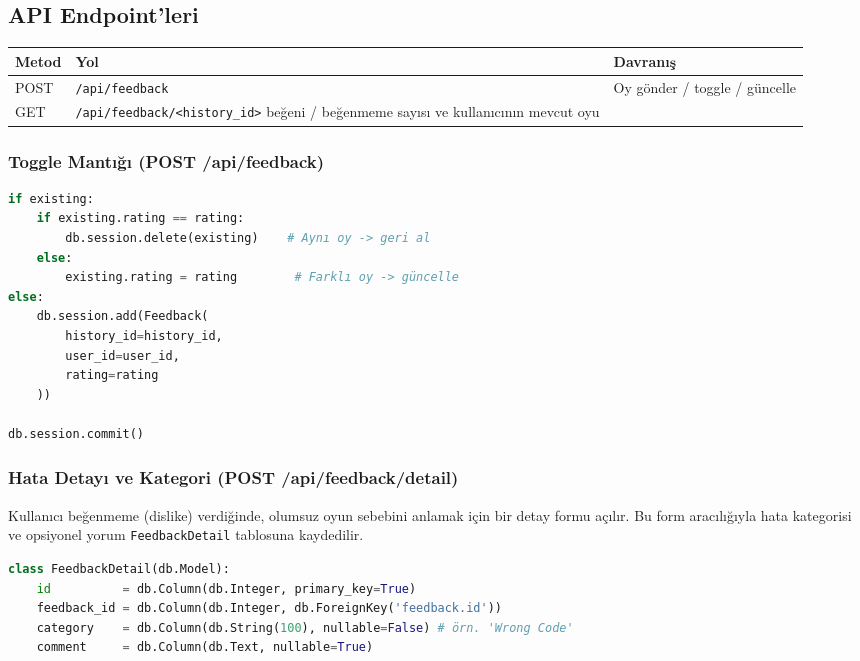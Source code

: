 \documentclass[12pt,a4paper]{article}
\begin{document}
\subsection{API Endpoint'leri}

\begin{tabularx}{\textwidth}{llX}
\toprule
\textbf{Metod} & \textbf{Yol} & \textbf{Davranış} \\
\midrule
POST & \texttt{/api/feedback}            & Oy gönder / toggle / güncelle \\
GET  & \texttt{/api/feedback/<history\_id>} beğeni / beğenmeme sayısı ve kullanıcının mevcut oyu \\
\bottomrule
\end{tabularx}

\subsubsection{Toggle Mantığı (POST /api/feedback)}

\begin{lstlisting}[language=Python, caption={app.py — oy ekleme, geri alma ve güncelleme}]
if existing:
    if existing.rating == rating:
        db.session.delete(existing)    # Aynı oy -> geri al
    else:
        existing.rating = rating        # Farklı oy -> güncelle
else:
    db.session.add(Feedback(
        history_id=history_id,
        user_id=user_id,
        rating=rating
    ))

db.session.commit()
\end{lstlisting}

\subsubsection{Hata Detayı ve Kategori (POST /api/feedback/detail)}

Kullanıcı beğenmeme (dislike) verdiğinde, olumsuz oyun sebebini anlamak için bir detay formu açılır. Bu form aracılığıyla hata kategorisi ve opsiyonel yorum \texttt{FeedbackDetail} tablosuna kaydedilir.

\begin{lstlisting}[language=Python, caption={models.py — FeedbackDetail modeli}]
class FeedbackDetail(db.Model):
    id          = db.Column(db.Integer, primary_key=True)
    feedback_id = db.Column(db.Integer, db.ForeignKey('feedback.id'))
    category    = db.Column(db.String(100), nullable=False) # örn. 'Wrong Code'
    comment     = db.Column(db.Text, nullable=True)
\end{lstlisting}
\end{document}
